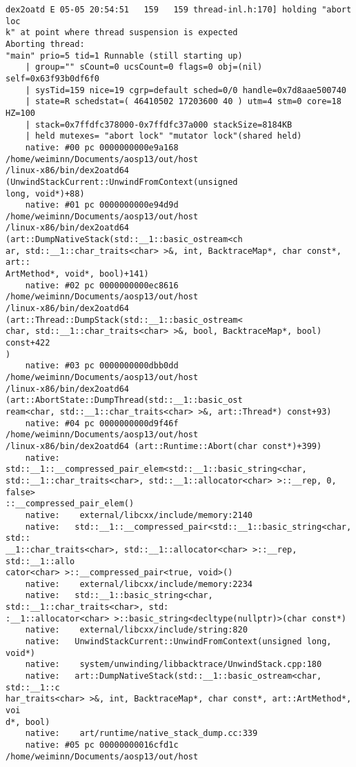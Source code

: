 \begin{lstlisting}
dex2oatd E 05-05 20:54:51   159   159 thread-inl.h:170] holding "abort loc
k" at point where thread suspension is expected
Aborting thread:
"main" prio=5 tid=1 Runnable (still starting up)
    | group="" sCount=0 ucsCount=0 flags=0 obj=(nil) self=0x63f93b0df6f0
    | sysTid=159 nice=19 cgrp=default sched=0/0 handle=0x7d8aae500740
    | state=R schedstat=( 46410502 17203600 40 ) utm=4 stm=0 core=18 HZ=100
    | stack=0x7ffdfc378000-0x7ffdfc37a000 stackSize=8184KB
    | held mutexes= "abort lock" "mutator lock"(shared held)
    native: #00 pc 0000000000e9a168  /home/weiminn/Documents/aosp13/out/host
/linux-x86/bin/dex2oatd64 (UnwindStackCurrent::UnwindFromContext(unsigned 
long, void*)+88)
    native: #01 pc 0000000000e94d9d  /home/weiminn/Documents/aosp13/out/host
/linux-x86/bin/dex2oatd64 (art::DumpNativeStack(std::__1::basic_ostream<ch
ar, std::__1::char_traits<char> >&, int, BacktraceMap*, char const*, art::
ArtMethod*, void*, bool)+141)
    native: #02 pc 0000000000ec8616  /home/weiminn/Documents/aosp13/out/host
/linux-x86/bin/dex2oatd64 (art::Thread::DumpStack(std::__1::basic_ostream<
char, std::__1::char_traits<char> >&, bool, BacktraceMap*, bool) const+422
)
    native: #03 pc 0000000000dbb0dd  /home/weiminn/Documents/aosp13/out/host
/linux-x86/bin/dex2oatd64 (art::AbortState::DumpThread(std::__1::basic_ost
ream<char, std::__1::char_traits<char> >&, art::Thread*) const+93)
    native: #04 pc 0000000000d9f46f  /home/weiminn/Documents/aosp13/out/host
/linux-x86/bin/dex2oatd64 (art::Runtime::Abort(char const*)+399)
    native:   std::__1::__compressed_pair_elem<std::__1::basic_string<char, 
std::__1::char_traits<char>, std::__1::allocator<char> >::__rep, 0, false>
::__compressed_pair_elem()
    native:    external/libcxx/include/memory:2140
    native:   std::__1::__compressed_pair<std::__1::basic_string<char, std::
__1::char_traits<char>, std::__1::allocator<char> >::__rep, std::__1::allo
cator<char> >::__compressed_pair<true, void>()
    native:    external/libcxx/include/memory:2234
    native:   std::__1::basic_string<char, std::__1::char_traits<char>, std:
:__1::allocator<char> >::basic_string<decltype(nullptr)>(char const*)
    native:    external/libcxx/include/string:820
    native:   UnwindStackCurrent::UnwindFromContext(unsigned long, void*)
    native:    system/unwinding/libbacktrace/UnwindStack.cpp:180
    native:   art::DumpNativeStack(std::__1::basic_ostream<char, std::__1::c
har_traits<char> >&, int, BacktraceMap*, char const*, art::ArtMethod*, voi
d*, bool)
    native:    art/runtime/native_stack_dump.cc:339
    native: #05 pc 00000000016cfd1c  /home/weiminn/Documents/aosp13/out/host

\end{lstlisting}
